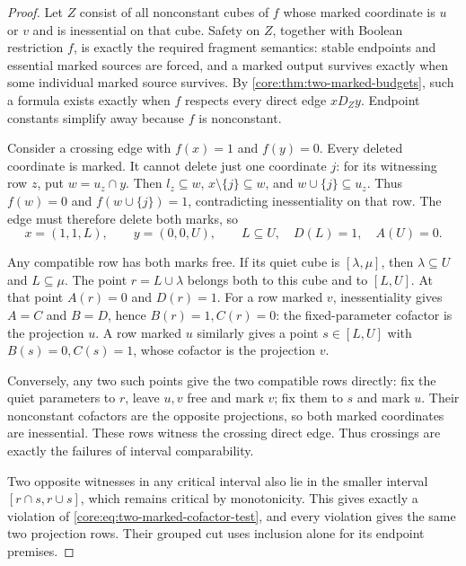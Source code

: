 \begin{proof}
Let $Z$ consist of all nonconstant cubes of $f$ whose marked coordinate
is $u$ or $v$ and is inessential on that cube. Safety on $Z$, together
with Boolean restriction $f$, is exactly the required fragment semantics:
stable endpoints and essential marked sources are forced, and a marked
output survives exactly when some individual marked source survives.
By \cref{core:thm:two-marked-budgets}, such a formula exists exactly when
$f$ respects every direct edge $xD_Zy$. Endpoint constants simplify away
because $f$ is nonconstant.

Consider a crossing edge with $f(x)=1$ and $f(y)=0$. Every deleted
coordinate is marked. It cannot delete just one coordinate $j$:
for its witnessing row $z$, put $w=u_z\cap y$. Then
$l_z\subseteq w$, $x\setminus\{j\}\subseteq w$, and $w\cup\{j\}\subseteq u_z$.
Thus $f(w)=0$ and $f(w\cup\{j\})=1$, contradicting inessentiality on
that row. The edge must therefore delete both marks, so
\[
 x=(1,1,L),\qquad y=(0,0,U),\qquad
 L\subseteq U,\quad D(L)=1,\quad A(U)=0.
\]

Any compatible row has both marks free. If its quiet cube is
$[\lambda,\mu]$, then $\lambda\subseteq U$ and $L\subseteq\mu$.
The point $r=L\cup\lambda$ belongs both to this cube and to $[L,U]$.
At that point $A(r)=0$ and $D(r)=1$. For a row marked $v$,
inessentiality gives $A=C$ and $B=D$, hence $B(r)=1,C(r)=0$:
the fixed-parameter cofactor is the projection $u$.
A row marked $u$ similarly gives a point $s\in[L,U]$ with
$B(s)=0,C(s)=1$, whose cofactor is the projection $v$.

Conversely, any two such points give the two compatible rows directly:
fix the quiet parameters to $r$, leave $u,v$ free and mark $v$;
fix them to $s$ and mark $u$. Their nonconstant cofactors are the
opposite projections, so both marked coordinates are inessential.
These rows witness the crossing direct edge. Thus crossings are exactly
the failures of interval comparability.

Two opposite witnesses in any critical interval also lie in the smaller
interval $[r\cap s,r\cup s]$, which remains critical by monotonicity.
This gives exactly a violation of \eqref{core:eq:two-marked-cofactor-test},
and every violation gives the same two projection rows. Their grouped
cut uses inclusion alone for its endpoint premises.
\end{proof}

